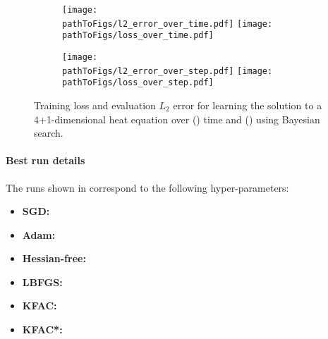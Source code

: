 \begin{figure}[!h]
  \centering
  \def\pathToFigs{kfac_pinns_exp/exp31_heat4d_mlp_tanh_256_bayes}
  \begin{subfigure}[t]{1.0\linewidth}
    \caption{}\label{subfig:heat4d-bayes-time}
    \texttt{[image: \\pathToFigs/l2\_error\_over\_time.pdf]}
    \texttt{[image: \\pathToFigs/loss\_over\_time.pdf]}
  \end{subfigure}
  \begin{subfigure}[t]{1.0\linewidth}
    \caption{}\label{subfig:heat4d-bayes-step}
    \texttt{[image: \\pathToFigs/l2\_error\_over\_step.pdf]}
    \texttt{[image: \\pathToFigs/loss\_over\_step.pdf]}
  \end{subfigure}
  \caption{Training loss and evaluation $L_2$ error for learning the solution to a 4+1-dimensional heat equation over () time and () using Bayesian search.}\label{fig:heat4d-bayes-appendix}
\end{figure}

\paragraph{Best run details}
The runs shown in  correspond to the following hyper-parameters:
\begin{itemize}
  \def\pathToRuns{kfac_pinns_exp/exp31_heat4d_mlp_tanh_256_bayes/tex/}
\item \textbf{SGD:} 
\item \textbf{Adam:} 
\item \textbf{Hessian-free:} 
\item \textbf{LBFGS:} 
\item \textbf{KFAC:} 
\item \textbf{KFAC*:} 
\end{itemize}

